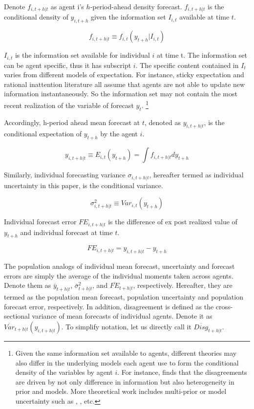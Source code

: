 \documentclass[12pt]{article}
\begin{document}
	Denote $ f_{i,t+h|t}$ as agent i's $h$-period-ahead density forecast. $ f_{i,t+h|t}$ is the conditional density of $y_{i,t+h}$ given the information set $I_{i,t}$ available at time $t$. 
	
	$$f_{i,t+h|t} \equiv f_{i,t}(y_{t+h}|I_{i,t})$$
	
	
	$I_{i,t}$ is the information set available for individual $i$ at time t. The information set can be  agent specific, thus it has subscript $i$.  The specific content contained in $I_t$ varies from different models of expectation. For instance, sticky expectation and rational inattention literature all assume that agents are not able to update new information instantaneously. So the information set may not contain the most recent realization of the variable of forecast $y_t$. \footnote{Given the same information set available to agents, different theories may also differ in the underlying models each agent use to form the conditional density of the variables by agent $i$. For instance, \citet{patton2010forecasters} finds that the disagreements are driven by not only difference in information but also heterogeneity in prior and models. More theoretical work includes multi-prior or model uncertainty such as \citet{hansen2001robust}, \citet{hansen2008robustness}, etc.}
	
	Accordingly, h-period ahead mean forecast at $t$, denoted as $ y_{i,t+h|t}$, is the conditional expectation of $y_{t+h}$ by the agent $i$. 
	
	$$y_{i,t+h|t} \equiv E_{i,t}(y_{t+h}) =\int f_{i, t+h|t} d y_{t+h}$$
	
	Similarly, individual forecasting variance $\sigma_{i,t+h|t}$, hereafter termed as individual uncertainty in this paper, is the conditional variance.
	
	$$\sigma^2_{i,t+h|t} \equiv Var_{i,t}( y_{t+h} )$$
	
	Individual forecast error $FE_{i,t+h|t}$ is the difference of ex post realized value of $y_{t+h}$ and individual forecast at time $t$. 
	
	$$FE_{i,t+h|t} = y_{i,t+h|t} - y_{t+h}$$
	
	The population analogs of individual mean forecast, uncertainty and forecast errors are simply the average of the individual moments taken across agents. Denote them as $\bar y_{t+h|t}$, $\bar \sigma^2_{t+h|t}$, and $\overline{FE}_{t+h|t}$, respectively. Hereafter, they are termed as the population mean forecast, population uncertainty and population forecast error, respectively. In addition, disagreement is defined as the cross-sectional variance of mean forecasts of individual agents.  Denote it as $\overline{Var}_{t+h|t}(y_{i,t+h|t}) $. To simplify notation, let us directly call it $\overline{Disg}_{t+h|t}$.  
	
\end{document}
